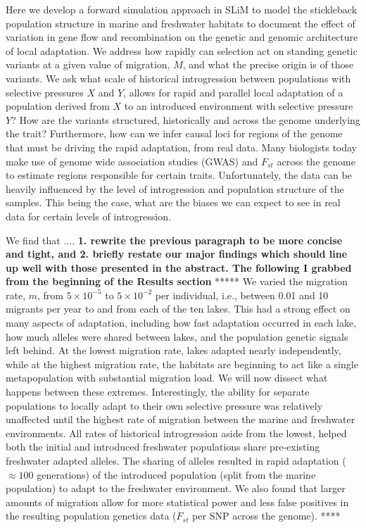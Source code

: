 \documentclass{article}
\begin{document}
Here we develop a forward simulation approach in SLiM to model the stickleback population structure in marine and freshwater habitats to document the effect of variation in gene flow and recombination on the genetic and genomic architecture of local adaptation. We address how rapidly can selection act on standing genetic variants at a given value of migration, $M$, and what the precise origin is of those variants. We ask what scale of historical introgression between populations with selective pressures $X$ and $Y$, allows for rapid and parallel local adaptation of a population derived from $X$ to an introduced environment with selective pressure $Y$? How are the variants structured, historically and across the genome underlying the trait? Furthermore, how can we infer causal loci for regions of the genome that must be driving the rapid adaptation, from real data. Many biologists today make use of genome wide association studies (GWAS) and $F_{st}$ across the genome to estimate regions responsible for certain traits. Unfortunately, the data can be heavily influenced by the level of introgression and population structure of the samples. This being the case, what are the biases we can expect to see in real data for certain levels of introgression. 

We find that .... \textbf{1. rewrite the previous paragraph to be more concise and tight, and 2. briefly restate our major findings which should line up well with those presented in the abstract. The following I grabbed from the beginning of the Results section}
*****
We varied the migration rate, $m$, from $5 \times 10^{-5}$ to $5 \times 10^{-2}$ per individual, i.e., between 0.01 and 10 migrants per year to and from each of the ten lakes. This had a strong effect on many aspects of adaptation, including how fast adaptation occurred in each lake, how much alleles were shared between lakes,
and the population genetic signals left behind. At the lowest migration rate, lakes adapted nearly independently, while at the highest migration rate, the habitats are beginning to act like a single metapopulation with substantial migration load. We will now dissect what happens between these extremes. Interestingly, the ability for separate populations to locally adapt to their own selective pressure was relatively unaffected until the highest rate of migration between the marine and freshwater environments. All rates of historical introgression aside from the lowest, helped both the initial and introduced freshwater populations share pre-existing freshwater adapted alleles. The sharing of alleles resulted in rapid adaptation ($\approx 100$ generations) of the introduced population (split from the marine population) to adapt to the freshwater environment. We also found that larger amounts of migration allow for more statistical power and less false positives in the resulting population genetics data ($F_{st}$ per SNP across the genome).
****
\end{document}

